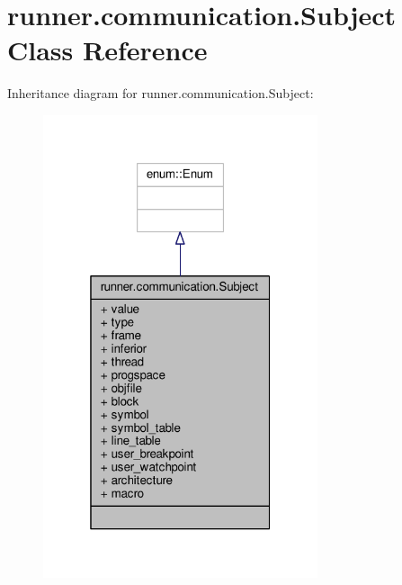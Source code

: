 \hypertarget{classrunner_1_1communication_1_1Subject}{}\section{runner.\+communication.\+Subject Class Reference}
\label{classrunner_1_1communication_1_1Subject}


Inheritance diagram for runner.\+communication.\+Subject\+:
\nopagebreak
\begin{figure}[H]
\begin{center}
\leavevmode
\includegraphics[width=229pt]{classrunner_1_1communication_1_1Subject__inherit__graph}
\end{center}
\end{figure}


